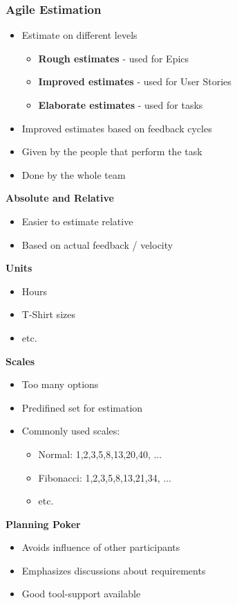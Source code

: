 \subsubsection{Agile Estimation}
\begin{itemize}
    \item Estimate on different levels
    \begin{itemize}
        \item \textbf{Rough estimates} - used for Epics
        \item \textbf{Improved estimates} - used for User Stories
        \item \textbf{Elaborate estimates} - used for tasks
    \end{itemize}
    \item Improved estimates based on feedback cycles
    \item Given by the people that perform the task
    \item Done by the whole team
\end{itemize}

\textbf{Absolute and Relative}
\begin{itemize}
    \item Easier to estimate relative
    \item Based on actual feedback / velocity
\end{itemize}

\textbf{Units}
\begin{itemize}
    \item Hours
    \item T-Shirt sizes
    \item etc.
\end{itemize}

\textbf{Scales}
\begin{itemize}
    \item Too many options
    \item Predifined set for estimation
    \item Commonly used scales:
    \begin{itemize}
        \item Normal: 1,2,3,5,8,13,20,40, ...
        \item Fibonacci: 1,2,3,5,8,13,21,34, ...
        \item etc.
    \end{itemize}
\end{itemize}

\textbf{Planning Poker}
\begin{itemize}
    \item Avoids influence of other participants
    \item Emphasizes discussions about requirements
    \item Good tool-support available
\end{itemize}









